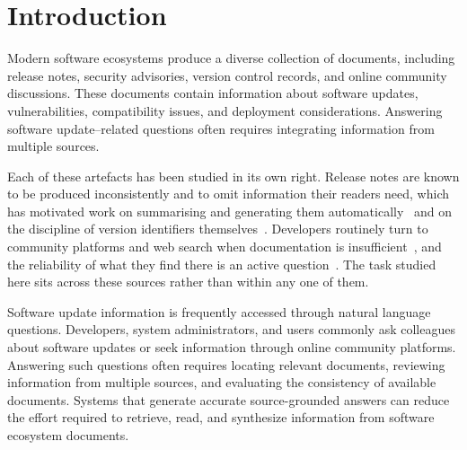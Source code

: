 \documentclass[acmsmall,review,anonymous,screen]{acmart}
\begin{document}


\maketitle

\section{Introduction}

Modern software ecosystems produce a diverse collection of documents, including release notes, security advisories, version control records, and online community discussions. These documents contain information about software updates, vulnerabilities, compatibility issues, and deployment considerations. Answering software update--related questions often requires integrating information from multiple sources.

Each of these artefacts has been studied in its own right. Release notes are known to be produced inconsistently and to omit information their readers need, which has motivated work on summarising and generating them automatically~\cite{abebe2016releasenotes,moreno2017arena,bi2022releasenotes} and on the discipline of version identifiers themselves~\cite{guo2025verlog}. Developers routinely turn to community platforms and web search when documentation is insufficient~\cite{xia2017websearch,zhang2018apimisuse}, and the reliability of what they find there is an active question~\cite{kabir2024stackoverflow,stolee2025codesearch}. The task studied here sits across these sources rather than within any one of them.

Software update information is frequently accessed through natural language questions. Developers, system administrators, and users commonly ask colleagues about software updates or seek information through online community platforms. Answering such questions often requires locating relevant documents, reviewing information from multiple sources, and evaluating the consistency of available documents. Systems that generate accurate source-grounded answers can reduce the effort required to retrieve, read, and synthesize information from software ecosystem documents.
\end{document}
